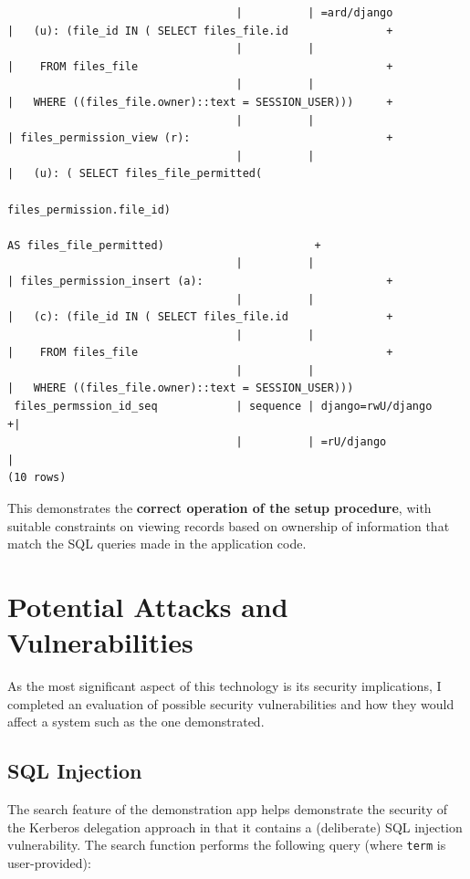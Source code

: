 \documentclass[12pt]{report}
\begin{document}
\begin{landscape}
{\begin{verbatim}
                                   |          | =ard/django           |   (u): (file_id IN ( SELECT files_file.id               +
                                   |          |                       |    FROM files_file                                      +
                                   |          |                       |   WHERE ((files_file.owner)::text = SESSION_USER)))     +
                                   |          |                       | files_permission_view (r):                              +
                                   |          |                       |   (u): ( SELECT files_file_permitted(
                                                                                 files_permission.file_id)
                                                                                 AS files_file_permitted)                       +
                                   |          |                       | files_permission_insert (a):                            +
                                   |          |                       |   (c): (file_id IN ( SELECT files_file.id               +
                                   |          |                       |    FROM files_file                                      +
                                   |          |                       |   WHERE ((files_file.owner)::text = SESSION_USER)))
 files_permssion_id_seq            | sequence | django=rwU/django    +|
                                   |          | =rU/django            |
(10 rows)
\end{verbatim}
  }

  This demonstrates the \textbf{correct operation of the setup procedure}, with suitable constraints on viewing records based on ownership of information that match the SQL queries made in the application code.

\end{landscape}

\section{Potential Attacks and Vulnerabilities}
\label{sec:potential_attacks}
As the most significant aspect of this technology is its security implications, I completed an evaluation of possible security vulnerabilities and how they would affect a system such as the one demonstrated.

\subsection{SQL Injection}
The search feature of the demonstration app helps demonstrate the security of the Kerberos delegation approach in that it contains a (deliberate) SQL injection vulnerability. The search function performs the following query (where \texttt{term} is user-provided):
\end{document}
